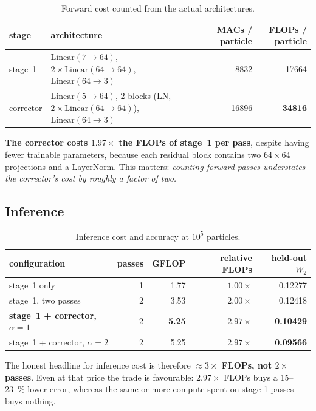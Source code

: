 ﻿\documentclass[11pt,a4paper]{article}
\newcommand{\Wtwo}{W_2}
\begin{document}
\begin{table}[h]
\centering\small
\begin{tabular}{@{}llrr@{}}
\toprule
stage & architecture & MACs / particle & FLOPs / particle \\
\midrule
stage~1 & $\mathrm{Linear}(7\to64)$, $2\times\mathrm{Linear}(64\to64)$,
  $\mathrm{Linear}(64\to3)$ & \num{8832} & \num{17664} \\
corrector & $\mathrm{Linear}(5\to64)$, 2 blocks (LN, $2\times\mathrm{Linear}(64\to64)$),
  $\mathrm{Linear}(64\to3)$ & \num{16896} & \textbf{\num{34816}} \\
\bottomrule
\end{tabular}
\caption{Forward cost counted from the actual architectures.}
\end{table}

\textbf{The corrector costs $1.97\times$ the FLOPs of stage~1 per pass}, despite having fewer
trainable parameters, because each residual block contains two $64\times64$ projections and a
LayerNorm. This matters: \emph{counting forward passes understates the corrector's cost by
roughly a factor of two.}

\subsection{Inference}

\begin{table}[h]
\centering\small
\begin{tabular}{@{}lrrrr@{}}
\toprule
configuration & passes & GFLOP & relative FLOPs & held-out $\Wtwo$ \\
\midrule
stage~1 only & 1 & 1.77 & $1.00\times$ & 0.12277 \\
stage~1, two passes & 2 & 3.53 & $2.00\times$ & 0.12418 \\
\textbf{stage~1 + corrector, $\alpha{=}1$} & 2 & \textbf{5.25} & $\mathbf{2.97\times}$ &
  \textbf{0.10429} \\
stage~1 + corrector, $\alpha{=}2$ & 2 & 5.25 & $2.97\times$ & \textbf{0.09566} \\
\bottomrule
\end{tabular}
\caption{Inference cost and accuracy at $10^5$ particles.}
\end{table}

The honest headline for inference cost is therefore \textbf{$\approx3\times$ FLOPs, not
$2\times$ passes}. Even at that price the trade is favourable: $2.97\times$ FLOPs buys a
\SI{15}{}--\SI{23}{\percent} lower error, whereas the same or more compute spent on stage-1
passes buys nothing.
\end{document}
